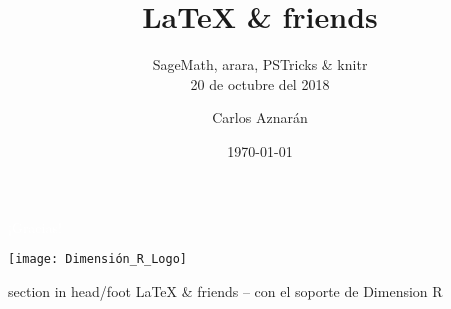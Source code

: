 \documentclass[spanish]{beamer}
\title[\LaTeX{} \& Friends]{\LaTeX{} \& friends}
\subtitle{SageMath, arara, PSTricks \& knitr\\[\baselineskip]
20 de octubre del 2018}
\author[Dimension R]{Carlos Aznarán}
\institute[Universidad Nacional de Ingeniería]{
Matemáticas\\
  Facultad de Ciencias\\
  Universidad Nacional de Ingeniería}
\date[\today]{
 \today}
\begin{document}
\begin{frame}
  \titlepage
\end{frame}

\begin{frame}
  \frametitle{\contentsname}

  \tableofcontents
\end{frame}








\begin{frame}[plain, b]
\centering
\huge \textcolor{white}{¡Gracias!}
\normalsize
\begin{center}
	\texttt{[image: Dimensión\_R\_Logo]}	\\
\end{center}
\vspace*{\fill}

 \begin{beamercolorbox}[wd=\paperwidth]{section in head/foot}
 \centering\large
\LaTeX{} \& friends -- con el soporte de Dimension R
\vskip10pt
\end{beamercolorbox}
 \end{frame}
\end{document}
